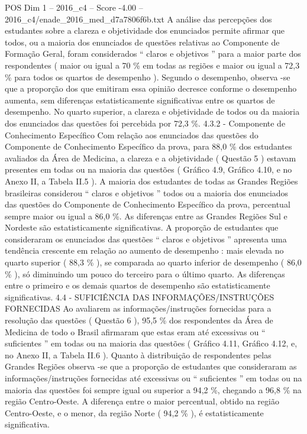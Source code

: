 \begin{textsample}{POS Dim 1 – 2016\_c4 – Score -4.00 – 2016\_c4/enade\_2016\_med\_d7a7806f6b.txt}
A análise das percepções dos estudantes sobre a clareza e objetividade dos enunciados permite afirmar que todos, ou a maioria dos enunciados de questões relativas ao Componente de Formação Geral, foram considerados “ claros e objetivos ” para a maior parte dos respondentes ( maior ou igual a 70 \% em todas as regiões e maior ou igual a 72,3 \% para todos os quartos de desempenho ).
Segundo o desempenho, observa -se que a proporção dos que emitiram essa opinião decresce conforme o desempenho aumenta, sem diferenças estatisticamente significativas entre os quartos de desempenho.
No quarto superior, a clareza e objetividade de todos ou da maioria dos enunciados das questões foi percebida por 72,3 \%. 4.3.2 - Componente de Conhecimento Específico Com relação aos enunciados das questões do Componente de Conhecimento Específico da prova, para 88,0 \% dos estudantes avaliados da Área de Medicina, a clareza e a objetividade ( Questão 5 ) estavam presentes em todas ou na maioria das questões ( Gráfico 4.9, Gráfico 4.10, e no Anexo II, a Tabela II.5 ).
A maioria dos estudantes de todas as Grandes Regiões brasileiras considerou “ claros e objetivos ” todos ou a maioria dos enunciados das questões do Componente de Conhecimento Específico da prova, percentual sempre maior ou igual a 86,0 \%.
As diferenças entre as Grandes Regiões Sul e Nordeste são estatisticamente significativas.
A proporção de estudantes que consideraram os enunciados das questões “ claros e objetivos ” apresenta uma tendência crescente em relação ao aumento de desempenho : mais elevada no quarto superior ( 88,3 \% ), se comparada ao quarto inferior de desempenho ( 86,0 \% ), só diminuindo um pouco do terceiro para o último quarto.
As diferenças entre o primeiro e os demais quartos de desempenho são estatisticamente significativas. 4.4 - SUFICIÊNCIA DAS INFORMAÇÕES/INSTRUÇÕES FORNECIDAS Ao avaliarem as informações/instruções fornecidas para a resolução das questões ( Questão 6 ), 95,5 \% dos respondentes da Área de Medicina de todo o Brasil afirmaram que estas eram até excessivas ou “ suficientes ” em todas ou na maioria das questões ( Gráfico 4.11, Gráfico 4.12, e, no Anexo II, a Tabela II.6 ).
Quanto à distribuição de respondentes pelas Grandes Regiões observa -se que a proporção de estudantes que consideraram as informações/instruções fornecidas até excessivas ou “ suficientes ” em todas ou na maioria das questões foi sempre igual ou superior a 94,2 \%, chegando a 96,8 \% na região Centro-Oeste.
A diferença entre o maior percentual, obtido na região Centro-Oeste, e o menor, da região Norte ( 94,2 \% ), é estatisticamente significativa.

\end{textsample}
